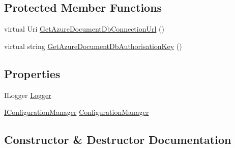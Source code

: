 \subsection*{Protected Member Functions}
\begin{DoxyCompactItemize}
\item 
virtual Uri \hyperlink{classCqrs_1_1Azure_1_1DocumentDb_1_1Factories_1_1AzureDocumentDbDataStoreConnectionStringFactory_af5d090f6195c7b59183db1eec8dcafc0}{Get\+Azure\+Document\+Db\+Connection\+Url} ()
\item 
virtual string \hyperlink{classCqrs_1_1Azure_1_1DocumentDb_1_1Factories_1_1AzureDocumentDbDataStoreConnectionStringFactory_a794c6926a7b29f927d41a0160716972a}{Get\+Azure\+Document\+Db\+Authorisation\+Key} ()
\end{DoxyCompactItemize}
\subsection*{Properties}
\begin{DoxyCompactItemize}
\item 
I\+Logger \hyperlink{classCqrs_1_1Azure_1_1DocumentDb_1_1Factories_1_1AzureDocumentDbDataStoreConnectionStringFactory_aa195f69522b48a21dc36db3ce64260e2}{Logger}
\item 
\hyperlink{interfaceCqrs_1_1Configuration_1_1IConfigurationManager}{I\+Configuration\+Manager} \hyperlink{classCqrs_1_1Azure_1_1DocumentDb_1_1Factories_1_1AzureDocumentDbDataStoreConnectionStringFactory_a7d0a40bb03e9e15306023bf97094cf60}{Configuration\+Manager}
\end{DoxyCompactItemize}


\subsection{Constructor \& Destructor Documentation}
\mbox{\label{classCqrs_1_1Azure_1_1DocumentDb_1_1Factories_1_1AzureDocumentDbDataStoreConnectionStringFactory_a9b08d89df792a20e71f5278dbf39b804}} 
